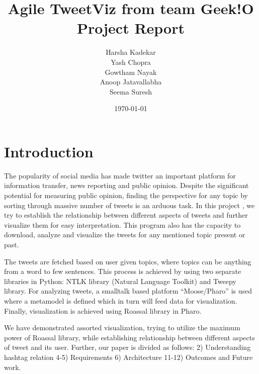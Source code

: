 \documentclass[11pt]{article}
\begin{document}
\title{%
 Agile TweetViz from team Geek!O\\
\large Project Report}
\author{Harsha Kadekar\\
  Yash Chopra\\
  Gowtham Nayak\\
  Anoop Jatavallabha\\
  Seema Suresh}
\date{\today}
\maketitle
\newpage
\tableofcontents
\newpage
\listoffigures
\newpage


\section{Introduction}
The popularity of social media has made twitter an important platform for information transfer, news reporting and public opinion. Despite the significant potential for measuring public opinion, finding the perspective for any topic by sorting through massive number of tweets is an arduous task. In this project , we try to establish the relationship between different aspects of tweets and further visualize them for easy interpretation. This program also has the capacity to download, analyze and visualize the tweets for any mentioned topic present or past.
 
The tweets are fetched based on user given topics, where topics can be anything from a word to few sentences. This process is achieved by using two	 separate libraries in Python: NTLK library (Natural Language Toolkit) and Tweepy library. For analyzing tweets, a smalltalk based platform “Moose/Pharo” is used where a metamodel is defined which in turn will feed data for visualization. Finally, visualization is achieved using Roassal library in Pharo.
 
We have demonstrated assorted visualization, trying to utilize the maximum power of Roassal library, while establishing relationship between different aspects of tweet and its user. Further, our paper is divided as follows: 2) Understanding hashtag relation 4-5) Requirements 6) Architecture 11-12) Outcomes and Future work.
\end{document}
